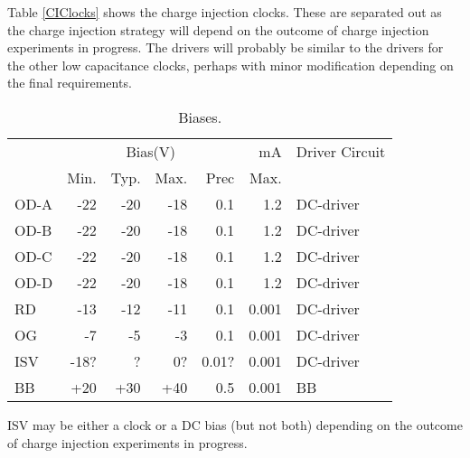 \documentclass[a4paper,12pt]{article}
\begin{document}
Table \ref{CIClocks} shows the charge injection clocks. These are separated out as the charge injection strategy will depend on the outcome of charge injection experiments in progress. The drivers will probably be similar to the drivers for the other low capacitance clocks, perhaps with minor modification depending on the final requirements.

\begin{table}[h]
\centering
\begin{tabular}{|l|rrrr|r|l|}
\hline
&\multicolumn{4}{c|}{Bias(V)} &mA&Driver Circuit \\
&Min.& Typ.& Max.&Prec& Max.&\\
\hline
OD-A &-22 &-20& -18& 0.1&1.2&DC-driver \\
OD-B &-22 &-20& -18& 0.1&1.2&DC-driver \\
OD-C &-22 &-20& -18& 0.1&1.2&DC-driver \\
OD-D &-22 &-20& -18& 0.1&1.2&DC-driver \\
RD &-13& -12 &-11& 0.1&0.001&DC-driver \\
OG& -7& -5& -3&  0.1&0.001&DC-driver \\
ISV & -18? & ? & 0? & 0.01? & 0.001 & DC-driver \\
BB &+20 &+30 &+40 &0.5&0.001&BB \\
\hline
\end{tabular}
 \caption{Biases.}
 \label{Biases}
\end{table}

ISV may be either a clock or a DC bias (but not both) depending on the outcome of charge injection experiments in progress.





\end{document}
